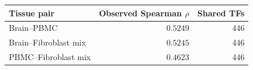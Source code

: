 \begin{tabular}{lrr}
\toprule
Tissue pair & Observed Spearman $\rho$ & Shared TFs \\ 
\midrule
Brain--PBMC & $0.5249$ & 446 \\
Brain--Fibroblast mix & $0.5245$ & 446 \\
PBMC--Fibroblast mix & $0.4623$ & 446 \\
\bottomrule
\end{tabular}
